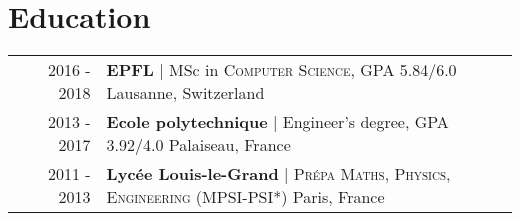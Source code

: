 \documentclass[a4paper,10pt]{article} %
\begin{document}

\section{Education}

\begin{tabularx}{\textwidth}{p{0.13cm}rX}

     & 2016 - \textsc{2018} & \textbf{\large EPFL} \hspace{0.2cm} | \hspace{0.01cm} MSc in \textsc{Computer Science}, GPA 5.84/6.0 \hfill Lausanne, Switzerland\vspace{0.2cm}                     \\

     & 2013 - \textsc{2017} & \textbf{\large Ecole polytechnique} \hspace{0.2cm} | \hspace{0.01cm} Engineer's degree, GPA 3.92/4.0 \hfill Palaiseau, France\vspace{0.2cm}                         \\

     & 2011 - 2013          & \textbf{\large Lyc\'ee Louis-le-Grand} \hspace{0.2cm} | \hspace{0.01cm} \textsc{Pr\'epa Maths, Physics, Engineering} (MPSI-PSI*) \hfill Paris, France\vspace{0.2cm} \\

\end{tabularx}




\end{document}
